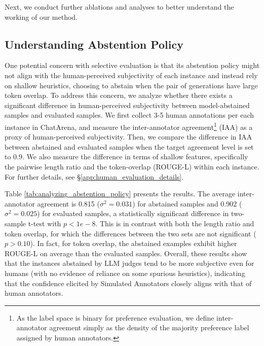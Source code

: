 Next, we conduct further ablations and analyses to better understand the working of our method.
\vspace{-5pt}

\subsection{Understanding Abstention Policy}

One potential concern with selective evaluation is that its abstention policy might not align with the human-perceived subjectivity of each instance and instead rely on shallow heuristics, \eg choosing to abstain when the pair of generations have large token overlap. To address this concern, we analyze whether there exists a significant difference in human-perceived subjectivity between model-abstained samples and evaluated samples. We first collect 3-5 human annotations per each instance in ChatArena, and measure the inter-annotator agreement\footnote{As the label space is binary for preference evaluation, we define inter-annotator agreement simply as the density of the majority preference label assigned by human annotators.} (IAA) as a proxy of human-perceived subjectivity. Then, we compare the difference in IAA between abstained and evaluated samples when the target agreement level is set to 0.9. We also measure the difference in terms of shallow features, specifically the pairwise length ratio and the token-overlap (ROUGE-L) within each instance. For further details, see \S \ref{app:human_evaluation_details}.


Table \ref{tab:analyzing_abstention_policy} presents the results. The average inter-annotator agreement is 0.815 ($\sigma^2 = 0.031$) for abstained samples and 0.902 ($\sigma^2 = 0.025$) for evaluated samples, a statistically significant difference in two-sample t-test with $p < 1e-8$. This is in contrast with both the length ratio and token overlap, for which the differences between the two sets are not significant ($p > 0.10$). In fact, for token overlap, the abstained examples exhibit higher ROUGE-L on average than the evaluated samples. Overall, these results show that the instances abstained by LLM judges tend to be more subjective even for humans (with no evidence of reliance on some spurious heuristics), indicating that the confidence elicited by Simulated Annotators closely aligns with that of human annotators.

